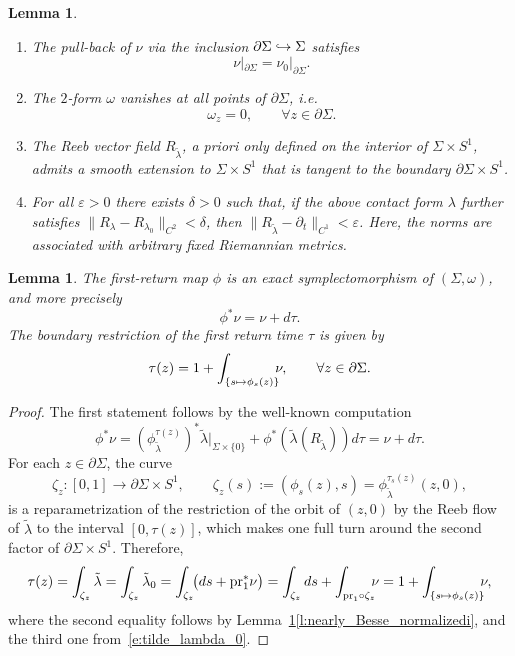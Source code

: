\documentclass[10pt,a4paper]{article}
\providecommand{\ie}{i.e.\ }
\let\epsilon\varepsilon
\newenvironment{enumeratei}
{\bgroup\def\theenumi{\roman{enumi}}\def\theenumii{\arabic{enumii}}\begin{enumerate}}
{\end{enumerate}\egroup}
\newcommand\mto{\mathchoice{\longmapsto}{\mapsto}{\mapsto}{\mapsto}}
\newcommand\hto{\mathrel{\lhook\joinrel\to}}
\newtheorem{lem}[thm]{Lemma}
\theoremstyle{definition}
\newcommand{\pr}{\mathrm{pr}}
\let\diff d
\begin{document}
\begin{lem}\label{l:nearly_Besse_normalized}
\begin{enumeratei}

\item\label{l:nearly_Besse_normalizedi}
The pull-back of $\nu$ via the inclusion $\partial\Sigma\hto\Sigma$ satisfies
\[
\nu|_{\partial\Sigma}=\nu_0|_{\partial\Sigma}.
\]

\item\label{l:nearly_Besse_normalizedii}
The $2$-form $\omega$ vanishes at all points of $\partial\Sigma$, \ie
\[
\omega_z= 0,\qquad \forall z\in \partial\Sigma.
\]

\item\label{l:nearly_Besse_normalizediii}
The Reeb vector field $R_{\tilde\lambda}$, a priori only defined on the interior of $\Sigma\times S^1$, admits a smooth extension to $\Sigma\times S^1$ that is tangent to the boundary $\partial \Sigma\times S^1$.

\item\label{l:nearly_Besse_normalizediv}
For all $\epsilon>0$ there exists $\delta>0$ such that, if the above contact form $\lambda$ further satisfies $\|R_\lambda-R_{\lambda_0}\|_{C^2}<\delta$, then $\|R_{\tilde\lambda}-\partial_t\|_{C^1}<\epsilon$. Here, the norms are associated with arbitrary fixed Riemannian metrics.
\end{enumeratei}
\end{lem}

\begin{lem}
\label{l:return_time_map}
The first-return map $\phi$ is an exact symplectomorphism of $(\Sigma,\omega)$, and more precisely
\[
\phi^*\nu =\nu+\diff\tau.
\]
The boundary restriction of the first return time $\tau$ is given by
\[
\tau(z)=1+\int_{\{s\mto \phi_s(z)\}} \!\!\! \nu,\qquad\forall z\in\partial\Sigma.
\]
\end{lem}

\begin{proof}
The first statement follows by the well-known computation
\[
\phi^*\nu = (\phi_{\tilde\lambda}^{\tau(z)})^*\tilde\lambda|_{\Sigma\times\{0\}} + \phi^*(\tilde\lambda(R_{\tilde\lambda}))\diff\tau=\nu+\diff\tau.
\]
For each $z\in\partial\Sigma$, the curve
\[
\zeta_z:[0,1]\to \partial\Sigma\times S^1,\qquad \zeta_z(s):=(\phi_s(z),s) = \phi_{\tilde{\lambda}}^{\tau_s(z)} (z,0),
\]
is a reparametrization of the restriction of the orbit of $(z,0)$ by the Reeb flow of $\tilde{\lambda}$ to the interval $[0,\tau(z)]$, which makes one full turn around the second factor of $\partial\Sigma\times S^1$. Therefore,
\[
\tau(z)
=\int_{\zeta_z} \tilde\lambda
=\int_{\zeta_z} \tilde\lambda_0
=\int_{\zeta_z} \!\!\big( \diff s + \pr_1^*\nu \big)
=\int_{\zeta_z} \diff s + \int_{\pr_1\circ\zeta_z} \!\!\!\nu
=1 + \int_{\{s\mto \phi_s(z)\}}\!\!\! \nu,
\]
where the second equality follows by Lemma~\ref{l:nearly_Besse_normalized}\eqref{l:nearly_Besse_normalizedi}, and the third one from~\eqref{e:tilde_lambda_0}.
\end{proof}
\end{document}
